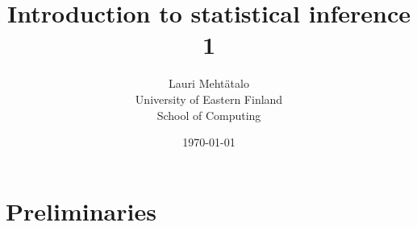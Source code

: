 \documentclass[10pt, twoside, a4paper]{book}
\theoremstyle{definition}
\begin{document}
\setlength{\baselineskip}{16pt}

\title{Introduction to statistical inference 1}

\author{Lauri Meht\"atalo\\
	   University of Eastern Finland \\ School of Computing
	   }

\date{\normalsize \today}
\maketitle
\tableofcontents



\mainmatter
{}

\chapter{Preliminaries}
\end{document}
